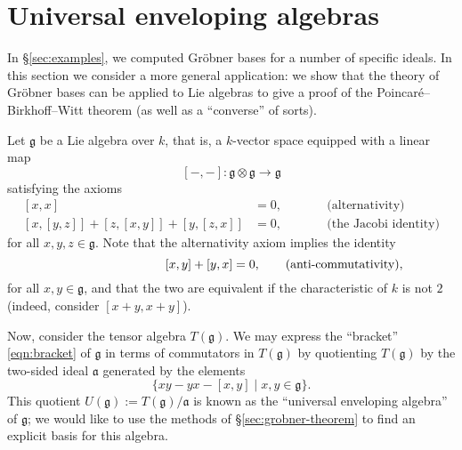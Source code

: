 \newcommand{\g}{\mathfrak{g}}
\renewcommand{\a}{\mathfrak{a}}
\newcommand{\Sym}{\operatorname{Sym}}

\section{Universal enveloping algebras}\label{sec:applications}

In \S\ref{sec:examples}, we computed Gr\"obner bases for a number of specific ideals. In this section we consider a more general application: we show that the theory of Gr\"obner bases can be applied to Lie algebras to give a proof of the Poincar\'e--Birkhoff--Witt theorem (as well as a ``converse'' of sorts).

Let $\g$ be a Lie algebra over $k$, that is, a $k$-vector space equipped with a linear map
\begin{equation}
\label{eqn:bracket}
[-,-]\colon\g\otimes\g\to\g
\end{equation}
satisfying the axioms
\begin{equation*}
\begin{aligned}
[x,x]&=0,\\
[x,[y,z]]+[z,[x,y]]+[y,[z,x]]&=0,
\end{aligned}
\qquad
\begin{aligned}
&\text{(alternativity)}\\
&\text{(the Jacobi identity)}
\end{aligned}
\end{equation*}
for all $x,y,z\in\g$. Note that the alternativity axiom implies the identity
\begin{equation}
\hspace{8.5em}[x,y]+[y,x]=0,\qquad\text{(anti-commutativity)},
\end{equation}
for all $x,y\in\g$, and that the two are equivalent if the characteristic of $k$ is not $2$ (indeed, consider $[x+y,x+y]$).

Now, consider the tensor algebra $T(\g)$. We may express the ``bracket'' \eqref{eqn:bracket} of $\g$ in terms of commutators in $T(\g)$ by quotienting $T(\g)$ by the two-sided ideal $\a$ generated by the elements
\begin{equation}
\label{eqn:ueaideal}
\{xy-yx-[x,y]\mid x,y\in\g\}.
\end{equation}
This quotient $U(\g):=T(\g)/\a$ is known as the ``universal enveloping algebra'' of $\g$; we would like to use the methods of \S\ref{sec:grobner-theorem} to find an explicit basis for this algebra.

